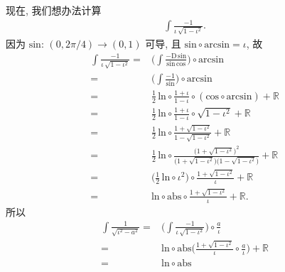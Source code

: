 \begin{example}
    现在, 我们想办法计算
    \begin{align*}
        \int {\frac{-1}{\iota\,\sqrt{1 - \iota^2}}}.
    \end{align*}
    因为 $\mathrm{sin}$: $(0, 2\pi/4) \to (0, 1)$ 可导, 且 $\mathrm{sin} \circ \mathrm{arcsin} = \iota$, 故
    \begin{align*}
        \int {\frac{-1}{\iota\,\sqrt{1 - \iota^2}}}
        = {} & \Bigg( \int {\frac{-\mathrm{D}\,\mathrm{sin}
        }{\mathrm{sin}\,\mathrm{cos}}} \Bigg) \circ \mathrm{arcsin}              \\
        = {} & \Bigg( \int {\frac{-1}{\mathrm{sin}}} \Bigg)
        \circ \mathrm{arcsin}                                                    \\
        = {} & \frac{1}{2}\,\mathrm{ln} \circ \frac{1 + \iota}{1 - \iota}
        \circ (\mathrm{cos} \circ \mathrm{arcsin}) + \mathbb{R}                  \\
        = {} & \frac{1}{2}\,\mathrm{ln} \circ \frac{1 + \iota}{1 - \iota}
        \circ \sqrt{1 - \iota^2} + \mathbb{R}                                    \\
        = {} & \frac{1}{2}\,\mathrm{ln} \circ \frac{1 + \sqrt{1 - \iota^2}}
        {1 - \sqrt{1 - \iota^2}} + \mathbb{R}                                    \\
        = {} & \frac{1}{2}\,\mathrm{ln} \circ \frac{\big( 1 + \sqrt{1 - \iota^2}
            \big)^2}
        {\big( 1 + \sqrt{1 - \iota^2} \big) \big( 1 - \sqrt{1 - \iota^2} \big)}
        + \mathbb{R}                                                             \\
        = {} & \bigg( \frac{1}{2}\,\mathrm{ln} \circ \iota^2 \bigg)
        \circ \frac{1 + \sqrt{1 - \iota^2}}{\iota} + \mathbb{R}                  \\
        = {} & \mathrm{ln} \circ \mathrm{abs}
        \circ \frac{1 + \sqrt{1 - \iota^2}}{\iota} + \mathbb{R}.
    \end{align*}
    所以
    \begin{align*}
        \int {\frac{1}{\sqrt{\iota^2 - a^2}}}
        = {} & \Bigg( \int {\frac{-1}{\iota\,\sqrt{1 - \iota^2}}} \Bigg)
        \circ \frac{a}{\iota}                                            \\
        = {} & \mathrm{ln} \circ \mathrm{abs}
        \Bigg( \frac{1 + \sqrt{1 - \iota^2}}{\iota} \circ \frac{a}{\iota}
        \Bigg) + \mathbb{R}                                              \\
        = {} & \mathrm{ln} \circ \mathrm{abs}

\end{align*}
\end{example}
